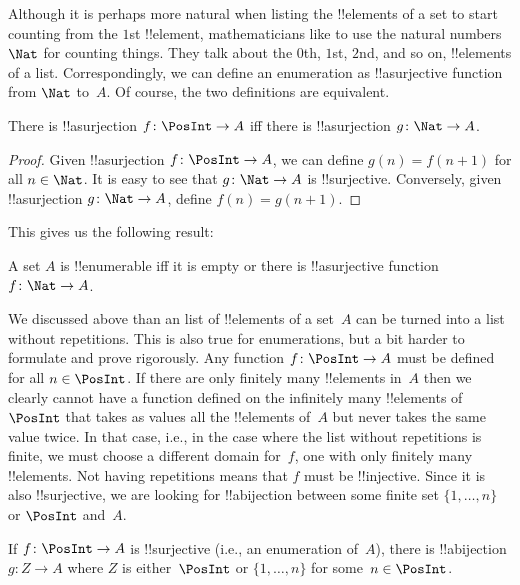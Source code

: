 \documentclass[../../../include/open-logic-section]{subfiles}
\begin{document}
Although it is perhaps more natural when listing the !!{element}s of a
set to start counting from the $1$st !!{element}, mathematicians like
to use the natural numbers~$\Nat$ for counting things. They
talk about the $0$th, $1$st, $2$nd, and so on, !!{element}s of a list.
Correspondingly, we can define an enumeration as !!a{surjective}
function from $\Nat$ to~$A$. Of course, the two definitions are
equivalent.

\begin{prop}
  There is !!a{surjection} $f\colon \PosInt \to A$ iff there is
  !!a{surjection} $g\colon \Nat \to A$.
\end{prop}

\begin{proof}
  Given !!a{surjection} $f\colon \PosInt \to A$, we can define $g(n) =
  f(n+1)$ for all $n \in \Nat$. It is easy to see that $g\colon \Nat
  \to A$ is !!{surjective}. Conversely, given !!a{surjection} $g\colon
  \Nat \to A$, define $f(n) = g(n+1)$.
\end{proof}

This gives us the following result:

\begin{cor}
A set $A$ is !!{enumerable} iff it is empty or there is
!!a{surjective} function $f\colon \Nat \to A$.
\end{cor}

We discussed above than an list of !!{element}s of a set~$A$ can be
turned into a list without repetitions. This is also true for
enumerations, but a bit harder to formulate and prove rigorously. Any
function $f\colon \PosInt \to A$ must be defined for all $n \in
\PosInt$. If there are only finitely many !!{element}s in~$A$ then we
clearly cannot have a function defined on the infinitely many
!!{element}s of~$\PosInt$ that takes as values all the !!{element}s
of~$A$ but never takes the same value twice. In that case, i.e., in
the case where the list without repetitions is finite, we must choose
a different domain for~$f$, one with only finitely many !!{element}s.
Not having repetitions means that $f$ must be !!{injective}. Since it
is also !!{surjective}, we are looking for !!a{bijection} between some
finite set $\{1, \dots, n\}$ or $\PosInt$ and~$A$.

\begin{prop}
If $f\colon \PosInt \to A$ is !!{surjective} (i.e., an enumeration
of~$A$), there is !!a{bijection} $g\colon Z \to A$ where $Z$ is
either~$\PosInt$ or $\{1, \dots, n\}$ for some~$n \in \PosInt$.
\end{prop}
\end{document}
